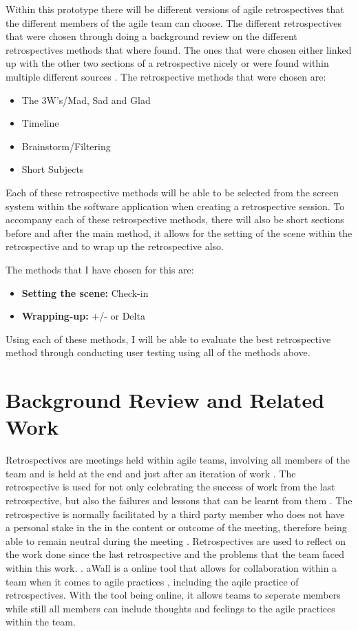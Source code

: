 \documentclass[11pt
              , a4paper
              , twoside
              , openright
              ]{report}
\begin{document}
Within this prototype there will be different versions of agile retrospectives that the different members of the agile team can choose. The different retrospectives that were chosen through doing a background review on the different retrospectives methods that where found. The ones that were chosen either linked up with the other two sections of a retrospective nicely or were found within multiple different sources \cite{AgileRetrospectivesEstherDerby, normanKeith}. The retrospective methods that were chosen are:
\begin{itemize}
	\item The 3W's/Mad, Sad and Glad
	\item Timeline
	\item Brainstorm/Filtering
	\item Short Subjects
\end{itemize}

Each of these retrospective methods will be able to be selected from the screen system within the software application when creating a retrospective session. To accompany each of these retrospective methods, there will also be short sections before and after the main method, it allows for the setting of the scene within the retrospective and to wrap up the retrospective also.

The methods that I have chosen for this are:  \cite{AgileRetrospectivesEstherDerby}
\begin{itemize}
	\item \textbf{Setting the scene:} Check-in
	\item \textbf{Wrapping-up:} +/- or Delta
\end{itemize}

Using each of these methods, I will be able to evaluate the best retrospective method through conducting user testing using all of the methods above.

\chapter{Background Review and Related Work}\label{C:background}
Retrospectives are meetings held within agile teams, involving all members of the team and is held at the end and just after an iteration of work \cite{AgileRetrospectivesEstherDerby,GettingValueFromRetrospectives}. The retrospective is used for not only celebrating the success of work from the last retrospective, but also the failures and lessons that can be learnt from them \cite {normanKeith}. The retrospective is normally facilitated by a third party member who does not have a personal stake in the in the content or outcome of the meeting, therefore being able to remain neutral during the meeting \cite{normanKeith,retrospectiveFacilator}. Retrospectives are used to reflect on the work done since the last retrospective and the problems that the team faced within this work. \cite{AgileRetrospectivesEstherDerby}. aWall is a online tool that allows for collaboration within a team when it comes to agile practices \cite{xp2017_aWall}, including the aqile practice of retrospectives. With the tool being online, it allows teams to seperate members while still all members can include thoughts and feelings to the agile practices within the team.  
\end{document}
